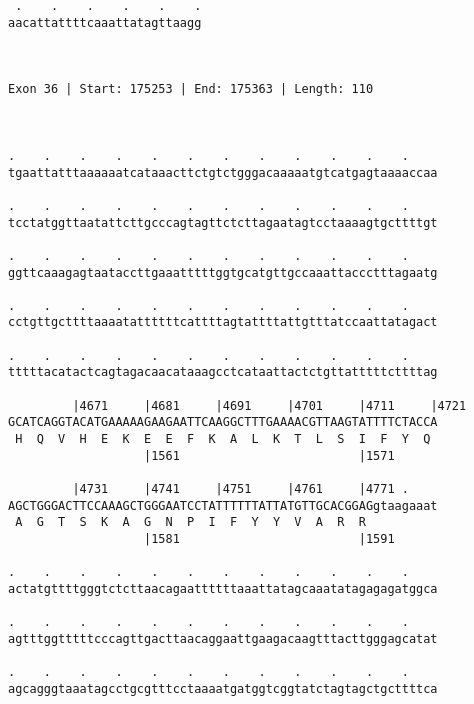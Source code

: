 \documentclass{article}
\begin{document}
\begin{Verbatim}
 .    .    .    .    .    .
aacattattttcaaattatagttaagg
                           
                           
 
Exon 36 | Start: 175253 | End: 175363 | Length: 110



.    .    .    .    .    .    .    .    .    .    .    .    
tgaattatttaaaaaatcataaacttctgtctgggacaaaaatgtcatgagtaaaaccaa
                                                            
.    .    .    .    .    .    .    .    .    .    .    .    
tcctatggttaatattcttgcccagtagttctcttagaatagtcctaaaagtgcttttgt
                                                            
.    .    .    .    .    .    .    .    .    .    .    .    
ggttcaaagagtaataccttgaaatttttggtgcatgttgccaaattaccctttagaatg
                                                            
.    .    .    .    .    .    .    .    .    .    .    .    
cctgttgcttttaaaatattttttcattttagtattttattgtttatccaattatagact
                                                            
.    .    .    .    .    .    .    .    .    .    .    .    
tttttacatactcagtagacaacataaagcctcataattactctgttatttttcttttag
                                                            
         |4671     |4681     |4691     |4701     |4711     |4721
GCATCAGGTACATGAAAAAGAAGAATTCAAGGCTTTGAAAACGTTAAGTATTTTCTACCA
 H  Q  V  H  E  K  E  E  F  K  A  L  K  T  L  S  I  F  Y  Q 
                   |1561                         |1571      
  
         |4731     |4741     |4751     |4761     |4771 .    
AGCTGGGACTTCCAAAGCTGGGAATCCTATTTTTTATTATGTTGCACGGAGgtaagaaat
 A  G  T  S  K  A  G  N  P  I  F  Y  Y  V  A  R  R          
                   |1581                         |1591      
  
.    .    .    .    .    .    .    .    .    .    .    .    
actatgttttgggtctcttaacagaattttttaaattatagcaaatatagagagatggca
                                                            
.    .    .    .    .    .    .    .    .    .    .    .    
agtttggtttttcccagttgacttaacaggaattgaagacaagtttacttgggagcatat
                                                            
.    .    .    .    .    .    .    .    .    .    .    .    
agcagggtaaatagcctgcgtttcctaaaatgatggtcggtatctagtagctgcttttca
                                                            

\end{Verbatim}
\end{document}

